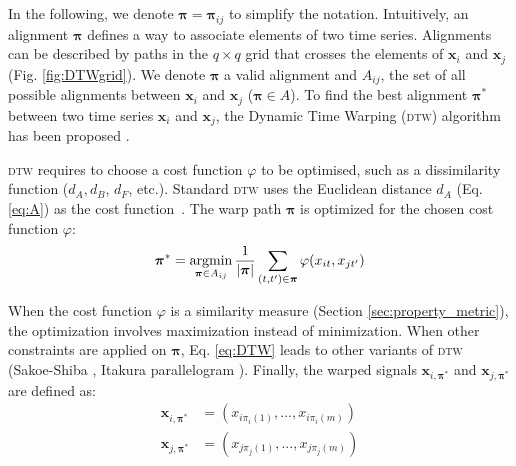 \noindent In the following, we denote $\boldsymbol{\pi}=\boldsymbol{\pi}_{ij}$ to simplify the notation. Intuitively, an alignment $\boldsymbol{\pi}$ defines a way to associate elements of two time series. Alignments can be described by paths in the $q \times q$ grid that crosses the elements of $\textbf{x}_i$ and $\textbf{x}_j$ (Fig. \ref{fig:DTWgrid}). We denote $\boldsymbol{\pi}$ a valid alignment and $A_{ij}$, the set of all possible alignments between $\textbf{x}_i$ and $\textbf{x}_j$ ($\boldsymbol{\pi} \in A$). To find the best alignment $\boldsymbol{\pi}^*$ between two time series $\textbf{x}_i$ and $\textbf{x}_j$, the Dynamic Time Warping (\textsc{dtw}) algorithm has been proposed \cite{Keogh2004,Salvador}.

\textsc{dtw} requires to choose a cost function $\varphi$ to be optimised, such as a dissimilarity function ($d_A, d_B$, $d_F$, etc.). Standard \textsc{dtw} uses the Euclidean distance $d_A$ (Eq. \ref{eq:A}) as the cost function~\cite{Berndt1994a}. The warp path $\boldsymbol{\pi}$ is optimized for the chosen cost function $\varphi$:
\begin{equation}
\boldsymbol{\pi}^* = \argmin_{\boldsymbol{\pi} \in A_{ij}} \frac{1}{|\boldsymbol{\pi}|}
\sum_{(t,t') \in \boldsymbol{\pi}} \varphi(x_{it}, x_{jt'})
\label{eq:DTW}
\end{equation}

\noindent When the cost function $\varphi$ is a similarity measure (Section \ref{sec:property_metric}), the optimization involves maximization instead of minimization. When other constraints are applied on $\boldsymbol{\pi}$, Eq. \eqref{eq:DTW} leads to other variants of \textsc{dtw} (Sakoe-Shiba \cite{Sakoe1978b}, Itakura parallelogram \cite{Rabiner1993}). Finally, the warped signals $\textbf{x}_{i,\boldsymbol{\pi}^*}$ and $\textbf{x}_{j,\boldsymbol{\pi}^*}$ are defined as:
\begin{align}
\textbf{x}_{i,\boldsymbol{\pi}^*} 
&= (x_{i\pi_i(1)}, ..., 
x_{i\pi_i(m)}) 			\\	
\textbf{x}_{j,\boldsymbol{\pi}^*} 
&= (x_{j\pi_j(1)}, ..., 
x_{j\pi_j(m)}) 	
\end{align}

